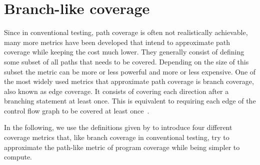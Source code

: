 

\begin{comment}
    - Analogous to the conventional path-like coverage I define program coverage    \/
    
    - Definition + example      \/
    
    - show that total program coverage means all possible answer sets get produced by the testsuite
    
    - talk about the problems here? (complexity + not possible for programs with variables as it is necessary to enumerate all 
    possible inputs to find maximum coverage)
\end{comment}

\section{Branch-like coverage}
\label{sec:Coverage metrics/Branch-like coverage}
Since in conventional testing, path coverage is often not realistically achievable, many more metrics have been developed that intend to approximate path coverage while keeping the cost much lower. They generally consist of defining some subset of all paths that needs to be covered. Depending on the size of this subset the metric can be more or less powerful and more or less expensive. One of the most widely used metrics that approximate path coverage is branch coverage, also known as edge coverage. It consists of covering each direction after a branching statement at least once. This is equivalent to requiring each edge of the control flow graph to be covered at least once~\cite[Chapter 7.2]{AO16}.

In the following, we use the definitions given by \textcite{Jan+10} to introduce four different coverage metrics that, like branch coverage in conventional testing, try to approximate the path-like metric of program coverage while being simpler to compute.

\begin{comment}
    - general introduction to branch-like coverage in conventional programming languages (source)     \/
    
        - use the control flow graph and cover every possible branch through this graph   \/
    
    - less complete but easier to compute, still very potent(?) (source)    (\/)
    
    - there are different types of branch like coverage even in conventional programming languages (source), the same is true here      \/

    - maybe example for both branch and path coverage?? -> requires conventional program as example -> maybe not
\end{comment}

